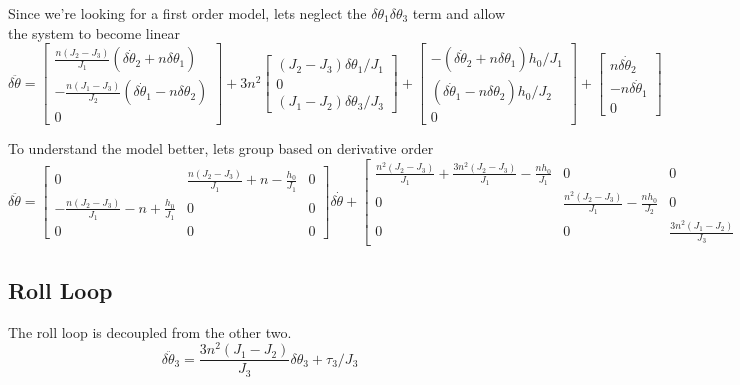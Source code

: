 \documentclass[]{article}
\begin{document}
Since we're looking for a first order model, lets neglect the $\delta \theta_1 \delta \theta_3$ term and allow the system to become linear
\begin{equation}
	\delta \ddot{\theta} = \begin{bmatrix}
		\frac{n(J_2 - J_3)}{J_1} \left(\delta \dot{\theta}_2 + n \delta \theta_1\right) \\
		-\frac{n(J_1 - J_3)}{J_2} \left(\delta \dot{\theta}_1 - n \delta \theta_2\right) \\
		0
	\end{bmatrix} +  3 n^2 \begin{bmatrix}
		(J_2 - J_3) \delta \theta_1/J_1 \\
		0\\
		(J_1 - J_2) \delta \theta_3/J_3
	\end{bmatrix} + \begin{bmatrix}
	-\left(\delta \dot{\theta}_2 + n \delta \theta_1\right) h_0/J_1 \\
	\left(\delta \dot{\theta}_1 - n \delta \theta_2\right) h_0/J_2 \\
	0
	\end{bmatrix} + \begin{bmatrix}
		n \delta \dot{\theta}_2 \\
		-n \delta \dot{\theta}_1 \\
		0 
	\end{bmatrix}
\end{equation}

To understand the model better, lets group based on derivative order
\begin{equation}
	\delta \ddot{\theta} = \begin{bmatrix}
		0 & \frac{n(J_2 - J_3)}{J_1} + n - \frac{h_0}{J_1} & 0 \\
		- \frac{n(J_2 - J_3)}{J_1} - n + \frac{h_0}{J_1} & 0 & 0 \\
		0 & 0 & 0
	\end{bmatrix}
	\delta \dot{\theta} + \begin{bmatrix}
		\frac{n^2(J_2 - J_3)}{J_1} + \frac{3n^2(J_2 - J_3)}{J_1} - \frac{n h_0}{J_1} & 0 & 0 \\
		0 & \frac{n^2(J_2 - J_3)}{J_1} - \frac{n h_0}{J_2} & 0 \\
		0 & 0 & \frac{3n^2(J_1 - J_2)}{J_3}
	\end{bmatrix}
	\delta \theta
\end{equation}

\subsection{Roll Loop}
The roll loop is decoupled from the other two.
\begin{equation}
	\delta \ddot{\theta}_3 = \frac{3n^2(J_1 - J_2)}{J_3} \delta \theta_3 + \tau_3/J_3
\end{equation}
\end{document}

